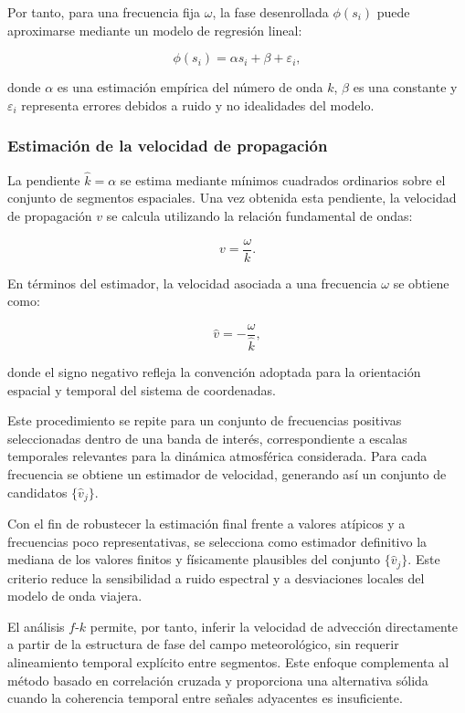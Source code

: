 \documentclass[
  spanish,
  us-letterpaper,
]{scrreprt}
\numberwithin{equation}{section}
\begin{document}
Por tanto, para una frecuencia fija \(\omega\), la fase desenrollada
\(\phi(s_i)\) puede aproximarse mediante un modelo de regresión lineal:

\[
\phi(s_i) = \alpha s_i + \beta + \varepsilon_i,
\]

donde \(\alpha\) es una estimación empírica del número de onda \(k\),
\(\beta\) es una constante y \(\varepsilon_i\) representa errores
debidos a ruido y no idealidades del modelo.

\subsubsection{Estimación de la velocidad de
propagación}\label{estimaciuxf3n-de-la-velocidad-de-propagaciuxf3n}

La pendiente \(\hat{k} = \alpha\) se estima mediante mínimos cuadrados
ordinarios sobre el conjunto de segmentos espaciales. Una vez obtenida
esta pendiente, la velocidad de propagación \(v\) se calcula utilizando
la relación fundamental de ondas:

\[
v = \frac{\omega}{k}.
\]

En términos del estimador, la velocidad asociada a una frecuencia
\(\omega\) se obtiene como:

\[
\hat{v} = -\frac{\omega}{\hat{k}},
\]

donde el signo negativo refleja la convención adoptada para la
orientación espacial y temporal del sistema de coordenadas.

Este procedimiento se repite para un conjunto de frecuencias positivas
seleccionadas dentro de una banda de interés, correspondiente a escalas
temporales relevantes para la dinámica atmosférica considerada. Para
cada frecuencia se obtiene un estimador de velocidad, generando así un
conjunto de candidatos \(\{\hat{v}_j\}\).

Con el fin de robustecer la estimación final frente a valores atípicos y
a frecuencias poco representativas, se selecciona como estimador
definitivo la mediana de los valores finitos y físicamente plausibles
del conjunto \(\{\hat{v}_j\}\). Este criterio reduce la sensibilidad a
ruido espectral y a desviaciones locales del modelo de onda viajera.

El análisis \(f\)-\(k\) permite, por tanto, inferir la velocidad de
advección directamente a partir de la estructura de fase del campo
meteorológico, sin requerir alineamiento temporal explícito entre
segmentos. Este enfoque complementa al método basado en correlación
cruzada y proporciona una alternativa sólida cuando la coherencia
temporal entre señales adyacentes es insuficiente.
\end{document}
